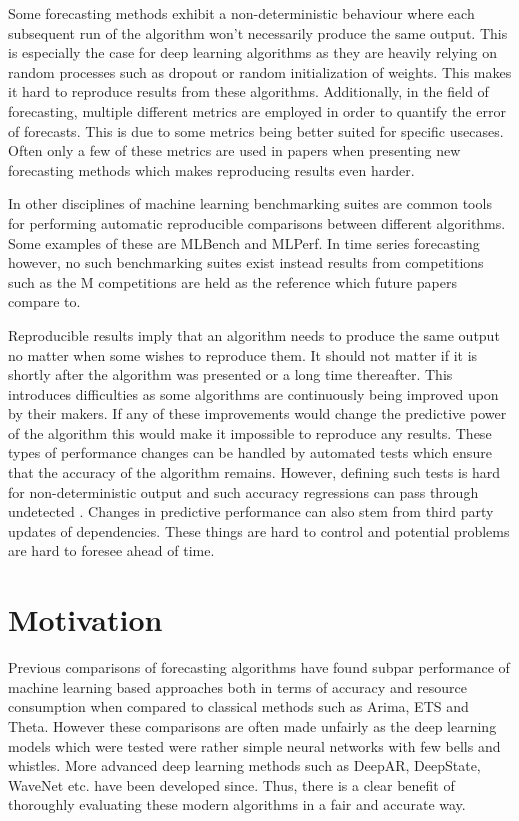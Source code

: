 Some forecasting methods exhibit a non-deterministic behaviour where each subsequent run of the algorithm won’t necessarily produce the same output. This is especially the case for deep learning algorithms as they are heavily relying on random processes such as dropout \cite{srivastava_dropout_2014} or random initialization of weights. This makes it hard to reproduce results from these algorithms. Additionally, in the field of forecasting, multiple different metrics are employed in order to quantify the error of forecasts. This is due to some metrics being better suited for specific usecases. Often only a few of these metrics are used in papers when presenting new forecasting methods which makes reproducing results even harder.

In other disciplines of machine learning benchmarking suites are common tools for performing automatic reproducible comparisons between different algorithms. Some examples of these are MLBench and MLPerf. In time series forecasting however, no such benchmarking suites exist instead results from competitions such as the M competitions  are held as the reference which future papers compare to. 

Reproducible results imply that an algorithm needs to produce the same output no matter when some wishes to reproduce them. It should not matter if it is shortly after the algorithm was presented or a long time thereafter. This introduces difficulties as some algorithms are continuously being improved upon by their makers. If any of these improvements would change the predictive power of the algorithm this would make it impossible to reproduce any results. These types of performance changes can be handled by automated tests which ensure that the accuracy of the algorithm remains. However, defining such tests is hard for non-deterministic output and such accuracy regressions can pass through undetected \cite{gluonts_deepar_github_issue}. Changes in predictive performance can also stem from third party updates of dependencies. These things are hard to control and potential problems are hard to foresee ahead of time. 



\section{Motivation}
Previous comparisons of forecasting algorithms have found subpar performance of machine learning based approaches both in terms of accuracy and resource consumption when compared to classical methods such as Arima, ETS and Theta. However these comparisons are often made unfairly as the deep learning models which were tested were rather simple neural networks with few bells and whistles. More advanced deep learning methods such as DeepAR, DeepState, WaveNet etc. have been developed since. Thus, there is a clear benefit of thoroughly evaluating these modern algorithms in a fair and accurate way. 

